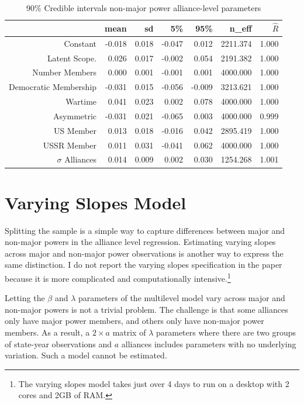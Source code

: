 \documentclass[12pt]{article}
\begin{document}
\begin{table}[ht]
\centering
\begin{tabular}{rrrrrrr}
  \hline
 & mean & sd & 5\% & 95\% & n\_eff & $\hat{R}$ \\ 
  \hline
Constant & -0.018 & 0.018 & -0.047 & 0.012 & 2211.374 & 1.000 \\ 
  Latent Scope. & 0.026 & 0.017 & -0.002 & 0.054 & 2191.382 & 1.000 \\ 
  Number Members & 0.000 & 0.001 & -0.001 & 0.001 & 4000.000 & 1.000 \\ 
  Democratic Membership & -0.031 & 0.015 & -0.056 & -0.009 & 3213.621 & 1.000 \\ 
  Wartime & 0.041 & 0.023 & 0.002 & 0.078 & 4000.000 & 1.000 \\ 
  Asymmetric & -0.031 & 0.021 & -0.065 & 0.003 & 4000.000 & 0.999 \\ 
  US Member & 0.013 & 0.018 & -0.016 & 0.042 & 2895.419 & 1.000 \\ 
  USSR Member & 0.011 & 0.031 & -0.041 & 0.062 & 4000.000 & 1.000 \\ 
  $\sigma$ Alliances & 0.014 & 0.009 & 0.002 & 0.030 & 1254.268 & 1.001 \\ 
   \hline
\end{tabular}
\caption{90\% Credible intervals non-major power alliance-level parameters}
\label{tab:alliance-level-min}
\end{table}



\section{Varying Slopes Model}

Splitting the sample is a simple way to capture differences between major and non-major powers in the alliance level regression. 
Estimating varying slopes across major and non-major power observations is another way to express the same distinction. 
I do not report the varying slopes specification in the paper because it is more complicated and computationally intensive.\footnote{The varying slopes model takes just over 4 days to run on a desktop with 2 cores and 2GB of RAM.}  


Letting the $\beta$ and $\lambda$ parameters of the multilevel model vary across major and non-major powers is not a trivial problem. 
The challenge is that some alliances only have major power members, and others only have non-major power members. 
As a result, a $2 \times a$ matrix of $\lambda$ parameters where there are two groups of state-year observations and $a$ alliances includes parameters with no underlying variation. 
Such a model cannot be estimated. 
\end{document}
